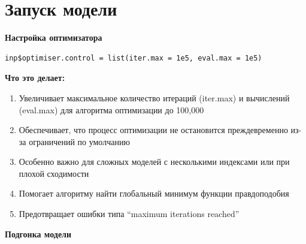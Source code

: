 \documentclass[
  letterpaper,
  DIV=11,
  numbers=noendperiod]{scrreprt}
\newenvironment{Shaded}{\begin{snugshade}}{\end{snugshade}}
\newcommand{\AttributeTok}[1]{\textcolor[rgb]{0.40,0.45,0.13}{#1}}
\newcommand{\CommentTok}[1]{\textcolor[rgb]{0.37,0.37,0.37}{#1}}
\newcommand{\DocumentationTok}[1]{\textcolor[rgb]{0.37,0.37,0.37}{\textit{#1}}}
\newcommand{\FloatTok}[1]{\textcolor[rgb]{0.68,0.00,0.00}{#1}}
\newcommand{\FunctionTok}[1]{\textcolor[rgb]{0.28,0.35,0.67}{#1}}
\newcommand{\NormalTok}[1]{\textcolor[rgb]{0.00,0.23,0.31}{#1}}
\newcommand{\OtherTok}[1]{\textcolor[rgb]{0.00,0.23,0.31}{#1}}
\newcommand{\SpecialCharTok}[1]{\textcolor[rgb]{0.37,0.37,0.37}{#1}}
\begin{document}
\section{Запуск
модели}\label{ux437ux430ux43fux443ux441ux43a-ux43cux43eux434ux435ux43bux438}

\begin{Shaded}
\end{Shaded}

\textbf{Настройка оптимизатора}

\begin{verbatim}
inp$optimiser.control = list(iter.max = 1e5, eval.max = 1e5)
\end{verbatim}

\textbf{Что это делает:}

\begin{enumerate}
\def\labelenumi{\arabic{enumi}.}
\item
  Увеличивает максимальное количество итераций (iter.max) и вычислений
  (eval.max) для алгоритма оптимизации до 100,000
\item
  Обеспечивает, что процесс оптимизации не остановится преждевременно
  из-за ограничений по умолчанию
\item
  Особенно важно для сложных моделей с несколькими индексами или при
  плохой сходимости
\item
  Помогает алгоритму найти глобальный минимум функции правдоподобия
\item
  Предотвращает ошибки типа ``maximum iterations reached''
\end{enumerate}

\textbf{Подгонка модели}
\end{document}
